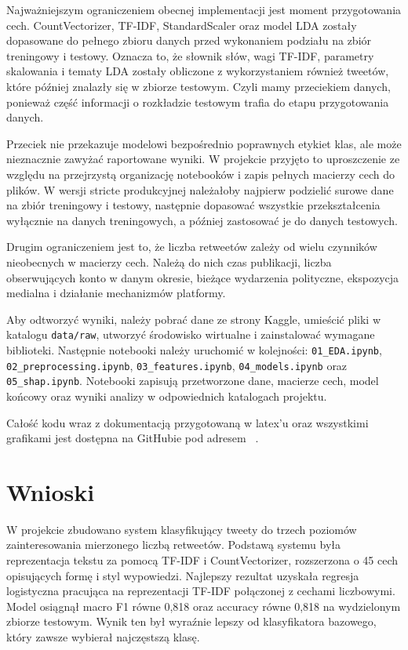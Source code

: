 \documentclass[12pt, a4paper, oneside]{scrreprt}
\begin{document}
Najważniejszym ograniczeniem obecnej implementacji jest moment przygotowania cech.
CountVectorizer, TF-IDF, StandardScaler oraz model LDA zostały dopasowane do pełnego
zbioru danych przed wykonaniem podziału na zbiór treningowy i testowy.
Oznacza to, że słownik słów, wagi TF-IDF, parametry skalowania i tematy LDA
zostały obliczone z wykorzystaniem również tweetów, które później znalazły się w zbiorze testowym.
Czyli mamy przeciekiem danych, ponieważ część informacji o rozkładzie testowym trafia do etapu przygotowania danych.

Przeciek nie przekazuje modelowi bezpośrednio poprawnych etykiet klas, ale może nieznacznie
zawyżać raportowane wyniki. W projekcie przyjęto to uproszczenie ze względu na
przejrzystą organizację notebooków i zapis pełnych macierzy cech do plików.
W wersji stricte produkcyjnej należałoby najpierw podzielić surowe dane na zbiór
treningowy i testowy, następnie dopasować wszystkie przekształcenia wyłącznie
na danych treningowych, a później zastosować je do danych testowych.

Drugim ograniczeniem jest to, że liczba retweetów zależy od wielu czynników nieobecnych w
macierzy cech. Należą do nich czas publikacji, liczba obserwujących konto w danym okresie,
bieżące wydarzenia polityczne, ekspozycja medialna i działanie mechanizmów platformy.

Aby odtworzyć wyniki, należy pobrać dane ze strony Kaggle, umieścić pliki w katalogu
\texttt{data/raw}, utworzyć środowisko wirtualne i zainstalować wymagane biblioteki.
Następnie notebooki należy uruchomić w kolejności: \texttt{01\_EDA.ipynb},
\texttt{02\_preprocessing.ipynb}, \texttt{03\_features.ipynb}, \texttt{04\_models.ipynb}
oraz \texttt{05\_shap.ipynb}. Notebooki zapisują przetworzone dane, macierze cech,
model końcowy oraz wyniki analizy w odpowiednich katalogach projektu.

Całość kodu wraz z dokumentacją przygotowaną w latex'u oraz wszystkimi grafikami
jest dostępna na GitHubie pod adresem ~\cite{repository}.

\chapter{Wnioski}

W projekcie zbudowano system klasyfikujący tweety do trzech poziomów zainteresowania
mierzonego liczbą retweetów. Podstawą systemu była reprezentacja tekstu za pomocą
TF-IDF i CountVectorizer, rozszerzona o 45 cech opisujących formę i styl wypowiedzi.
Najlepszy rezultat uzyskała regresja logistyczna pracująca na reprezentacji TF-IDF
połączonej z cechami liczbowymi. Model osiągnął macro F1 równe 0,818 oraz accuracy
równe 0,818 na wydzielonym zbiorze testowym. Wynik ten był wyraźnie lepszy
od klasyfikatora bazowego, który zawsze wybierał najczęstszą klasę.
\end{document}
